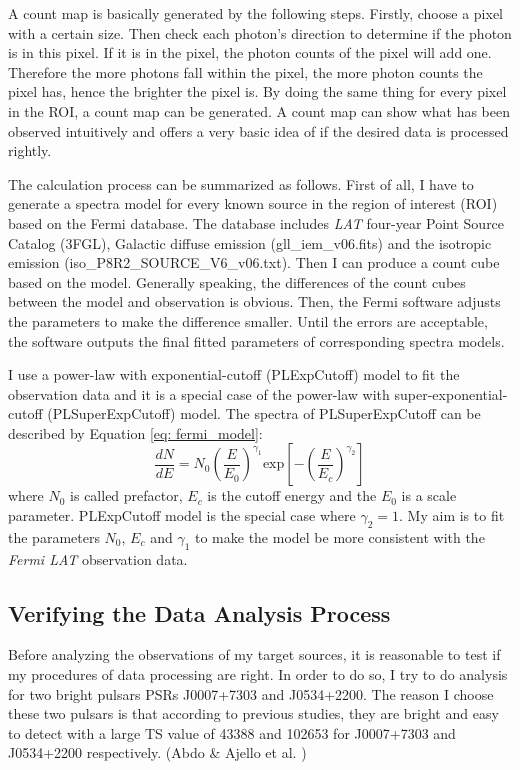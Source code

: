 \documentclass[12pt]{report}
\begin{document}
    A count map is basically generated by the following steps. Firstly, choose a 
    pixel with a certain size. Then check each photon's direction to determine if 
    the photon is in this pixel. If it is in the pixel, the photon counts of the 
    pixel will add one. Therefore the more photons fall within the pixel, the more 
    photon counts the pixel has, hence the brighter the pixel is. By doing the same 
    thing for every pixel in the ROI, a count map can be generated. A count map can show 
    what has been observed intuitively and offers a very basic idea of if 
    the desired data is processed rightly.
          
    The calculation process can be summarized as follows. First of all, I have to generate 
    a spectra model for every known source in the region of interest (ROI) based on the Fermi 
    database. The database includes \textit{LAT} four-year Point Source Catalog (3FGL), 
    Galactic diffuse emission (gll\_iem\_v06.fits) and the isotropic emission 
    (iso\_P8R2\_SOURCE\_V6\_v06.txt). Then I can produce a count cube based on the 
    model. Generally speaking, the differences of the count cubes between the model and 
    observation is obvious. Then, the Fermi software adjusts the parameters 
    to make the difference smaller. Until the errors are acceptable, the software 
    outputs the final fitted parameters of corresponding spectra models.    

    I use a power-law with exponential-cutoff (PLExpCutoff) model to fit the 
    observation data and it is a special case of the power-law with 
    super-exponential-cutoff (PLSuperExpCutoff) model. The spectra of PLSuperExpCutoff 
    can be described by Equation \ref{eq: fermi_model}:  
    \begin{equation} 
      \label{eq: fermi_model}
      \frac{dN}{dE} = N_{0} \left(\frac{E}{E_0}\right)^{\gamma_1}\mbox{exp}\left[-\left(\frac{E}{E_c}\right)^{\gamma_2}\right]
    \end{equation}  
    where $N_0$ is called prefactor, $E_c$ is the cutoff energy and the $E_0$ is a scale 
    parameter. PLExpCutoff model is the special case where $\gamma_2=1$. My aim is to 
    fit the parameters $N_0$, $E_c$ and $\gamma_1$ to make the model be more 
    consistent with the \textit{Fermi LAT} observation data.

    \subsection{Verifying the Data Analysis Process}
      Before analyzing the observations of my target sources, it is reasonable to test 
      if my procedures of data processing are right. In order to do so, I try to do 
      analysis for two bright pulsars PSRs J0007+7303 and J0534+2200. The reason I choose 
      these two pulsars is that according to previous studies, they are bright and easy 
      to detect with a large TS value of 43388 and 102653 for J0007+7303 and J0534+2200 
      respectively. (Abdo \& Ajello et al. \cite{0067-0049-208-2-17})
\end{document}

